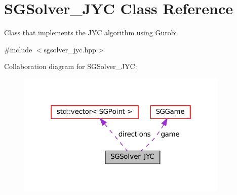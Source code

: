\hypertarget{classSGSolver__JYC}{}\section{S\+G\+Solver\+\_\+\+J\+YC Class Reference}
\label{classSGSolver__JYC}


Class that implements the J\+YC algorithm using Gurobi.  




{\ttfamily \#include $<$sgsolver\+\_\+jyc.\+hpp$>$}



Collaboration diagram for S\+G\+Solver\+\_\+\+J\+YC\+:
\nopagebreak
\begin{figure}[H]
\begin{center}
\leavevmode
\includegraphics[width=286pt]{classSGSolver__JYC__coll__graph}
\end{center}
\end{figure}
